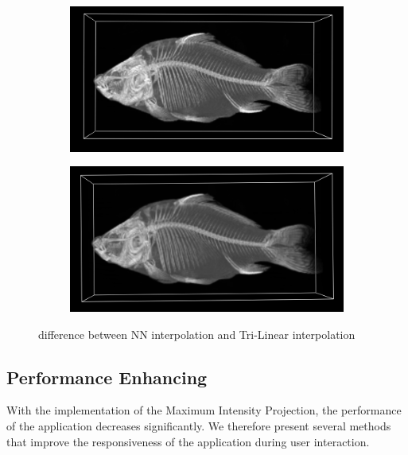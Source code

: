 \begin{figure}[h!]
    \centering
    \captionsetup{justification=centering,margin=0.5cm}
    \begin{subfigure}[t]{0.48\textwidth}
        \includegraphics[width=\textwidth]{img/fish_NN.png}
        \caption{ }
    \end{subfigure}
    \begin{subfigure}[t]{0.48\textwidth}
        \includegraphics[width=\textwidth]{img/fish_TriLin.png}
        \caption{ }
    \end{subfigure}
    \caption{difference between NN interpolation and Tri-Linear interpolation}
    \label{fig:trilinear1}
\end{figure}

\subsection{Performance Enhancing}\label{subsec:perf_enh}
With the implementation of the Maximum Intensity Projection, the performance of the application decreases significantly. We therefore present several methods that improve the responsiveness of the application during user interaction. 

